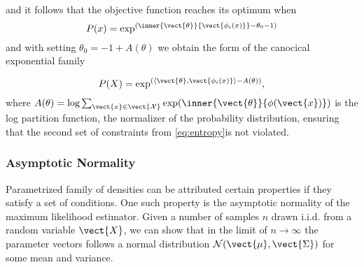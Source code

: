     and it follows that the objective function reaches its optimum when 
    \begin{equation}   
    P(x) = \exp^{(\inner{\vect{\theta}}{\vect{\phi_i(x)}} - \theta_0 - 1)}
    \end{equation} 
    and with setting $\theta_0 = -1 + A(\theta) $ we obtain the form of the canocical exponential family

    \begin{equation}
        P(X) = \exp^{(\langle\vect{\theta}, \vect{\phi_i(x)} \rangle - A(\theta))},
    \end{equation}
    where $A(\theta) = \log \sum_{\vect{x}\in \vect{\mathcal{X}}} \exp(\inner{\vect{\theta}}{\phi(\vect{x})})$ is the log partition function, the normalizer of the probability distribution, ensuring that the second set of constraints from \eq\ref{eq:entropy}is not violated.

        \subsubsection*{Asymptotic Normality}
        \label{ssec:asymp}
        Parametrized family of densities can be attributed certain properties if they satisfy a set of conditions. 
        One such property is the asymptotic normality of the maximum likelihood estimator.
        Given a number of samples $n$ drawn i.i.d. from a random variable $\vect{X}$, we can show that in the limit of $n \rightarrow \infty$ the parameter vectors follows a normal distribution $\mathcal{N}(\vect{\mu}, \vect{\Sigma})$ for some mean and variance.


